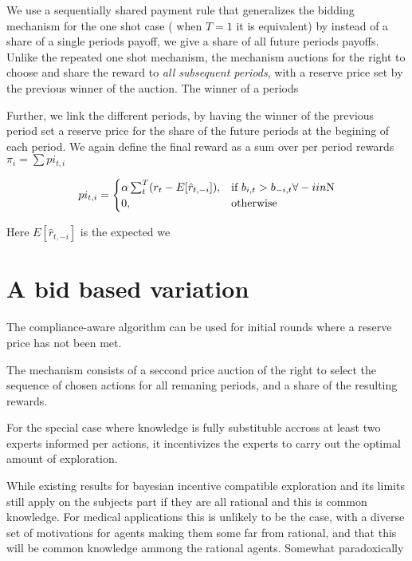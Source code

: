 We use a sequentially shared payment rule that generalizes the bidding mechanism for the one shot case ( when $T=1$ it is equivalent) by instead of a share of a single periods payoff, we give a share of all future periods payoffs.  Unlike the repeated one shot mechanism, the mechanism auctions for the right to choose and  share the reward to \emph{all subsequent periods}, with a reserve price set by the previous winner of the auction. The winner of a periods 

Further, we link the different periods, by having the winner of the previous period set a reserve price for the share of the future periods at the begining of each period. We again define the final reward as a sum over per period rewards $\pi_i = \sum pi_{t,i}$

\[
pi_{t,i} =
\begin{cases}
    \alpha \sum_t^T (r_t - E[\hat{r}_{t,-i}] ) ,& \text{if } b_{i,t} > b_{-i,t} \forall -i in $N$\\
    0,              & \text{otherwise}
\end{cases}
\]


Here $E[\hat{r}_{t,-i}]$ is the expected we


\section{A bid based variation}
The compliance-aware algorithm can be used for initial rounds where a reserve price has not been met.



The mechanism consists of a seccond price auction of the right to select the sequence of chosen actions for all remaning periods, and a share of the resulting rewards.

For the special case where knowledge is  fully substituble accross at least two experts informed per actions, it incentivizes the experts to carry out the optimal amount of exploration. 

While existing results for bayesian incentive compatible exploration and its limits still apply on the subjects part if they are all rational and this is common knowledge. For medical applications this is unlikely to be the case, with a diverse set of motivations for agents making them some far from rational, and that this will be common knowledge ammong the rational agents. Somewhat paradoxically 





